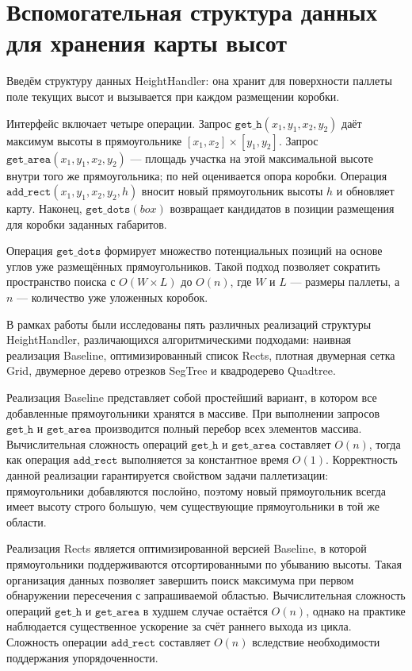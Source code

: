 \section{Вспомогательная структура данных для хранения карты высот}

Введём структуру данных HeightHandler: она хранит для поверхности паллеты поле текущих высот и вызывается при каждом размещении коробки.

Интерфейс включает четыре операции. Запрос $\mathtt{get\_h}(x_1, y_1, x_2, y_2)$ даёт максимум высоты в прямоугольнике $[x_1, x_2] \times [y_1, y_2]$. Запрос $\mathtt{get\_area}(x_1, y_1, x_2, y_2)$ --- площадь участка на этой максимальной высоте внутри того же прямоугольника; по ней оценивается опора коробки. Операция $\mathtt{add\_rect}(x_1, y_1, x_2, y_2, h)$ вносит новый прямоугольник высоты $h$ и обновляет карту. Наконец, $\mathtt{get\_dots}(\mathit{box})$ возвращает кандидатов в позиции размещения для коробки заданных габаритов.

Операция $\mathtt{get\_dots}$ формирует множество потенциальных позиций на основе углов уже размещённых прямоугольников. Такой подход позволяет сократить пространство поиска с $O(W \times L)$ до $O(n)$, где $W$ и $L$ --- размеры паллеты, а $n$ --- количество уже уложенных коробок.

В рамках работы были исследованы пять различных реализаций структуры HeightHandler, различающихся алгоритмическими подходами: наивная реализация Baseline, оптимизированный список Rects, плотная двумерная сетка Grid, двумерное дерево отрезков SegTree и квадродерево Quadtree.

Реализация Baseline представляет собой простейший вариант, в котором все добавленные прямоугольники хранятся в массиве. При выполнении запросов $\mathtt{get\_h}$ и $\mathtt{get\_area}$ производится полный перебор всех элементов массива. Вычислительная сложность операций $\mathtt{get\_h}$ и $\mathtt{get\_area}$ составляет $O(n)$, тогда как операция $\mathtt{add\_rect}$ выполняется за константное время $O(1)$. Корректность данной реализации гарантируется свойством задачи паллетизации: прямоугольники добавляются послойно, поэтому новый прямоугольник всегда имеет высоту строго большую, чем существующие прямоугольники в той же области.

Реализация Rects является оптимизированной версией Baseline, в которой прямоугольники поддерживаются отсортированными по убыванию высоты. Такая организация данных позволяет завершить поиск максимума при первом обнаружении пересечения с запрашиваемой областью. Вычислительная сложность операций $\mathtt{get\_h}$ и $\mathtt{get\_area}$ в худшем случае остаётся $O(n)$, однако на практике наблюдается существенное ускорение за счёт раннего выхода из цикла. Сложность операции $\mathtt{add\_rect}$ составляет $O(n)$ вследствие необходимости поддержания упорядоченности.

